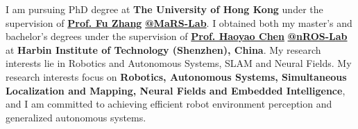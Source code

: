 %
%

\par{
I am pursuing PhD degree at \textbf{The University of Hong Kong} under the supervision of \href{https://mars.hku.hk/}{\textbf{Prof. Fu Zhang}} \href{https://mars.hku.hk/}{\textbf{@MaRS-Lab}}. I obtained both my master's and bachelor's degrees under the supervision of \href{http://nrs-lab.com//}{\textbf{Prof. Haoyao Chen}} \href{http://nrs-lab.com/}{\textbf{@nROS-Lab}} at \textbf{Harbin Institute of Technology (Shenzhen), China}.
My research interests lie in Robotics and Autonomous Systems, SLAM and Neural Fields.
My  research interests focus on \textbf{Robotics, Autonomous Systems, Simultaneous Localization and Mapping, Neural Fields and Embedded Intelligence}, and I am committed to achieving efficient robot environment perception and generalized autonomous systems.
}